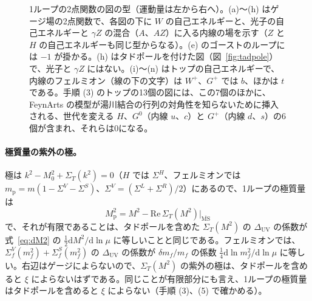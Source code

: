 \documentclass[a4paper,10pt]{ltjsarticle}
\newcommand{\dd}{\mathrm{d}}
\newcommand{\MSbar}{\overline{\mathrm{MS}}}
\newcommand{\DUV}{\Delta_{\mathrm{UV}}}
\newcommand{\re}{\mathrm{Re}\,}
\begin{document}
\begin{figure}[tbp]
\caption{1ループの2点関数の図の型（運動量は左から右へ）。(a)〜(h) はゲージ場の2点関数で、各図の下に $W$ の自己エネルギーと、光子の自己エネルギーと $\gamma Z$ の混合（$A$、$AZ$）に入る内線の場を示す（$Z$ と $H$ の自己エネルギーも同じ型からなる）。(e) のゴーストのループには $-1$ が掛かる。(h) はタドポールを付けた図（図~\ref{fig:tadpole}）で、光子と $\gamma Z$ にはない。(i)〜(n) はトップの自己エネルギーで、内線のフェルミオン（線の下の文字）は $W^+$、$G^+$ では $b$、ほかは $t$ である。手順 (3) のトップの13個の図には、この7個のほかに、FeynArts の模型が湯川結合の行列の対角性を知らないために挿入される、世代を変える $H$、$G^0$（内線 $u$、$c$）と $G^+$（内線 $d$、$s$）の6個が含まれ、それらは0になる。}
\label{fig:se}
\end{figure}

\paragraph{極質量の紫外の極。}極は $k^2-M_0^2+\Sigma_T(k^2)=0$（$H$ では $\Sigma^H$、フェルミオンでは $m_{\mathrm p}=m(1-\Sigma^V-\Sigma^S)$、$\Sigma^V=(\Sigma^L+\Sigma^R)/2$）にあるので、1ループの極質量は
\begin{equation}
M_{\mathrm p}^2=M^2-\re\Sigma_T(M^2)\big|_{\MSbar}
\label{eq:pole}
\end{equation}
で、それが有限であることは、タドポールを含めた $\Sigma_T(M^2)$ の $\DUV$ の係数が式~\eqref{eq:dM2} の $\frac12\dd M^2/\dd\ln\mu$ に等しいことと同じである。フェルミオンでは、$\Sigma^V_f(m_f^2)+\Sigma^S_f(m_f^2)$ の $\DUV$ の係数が $\delta m_f/m_f$ の係数 $\frac14\dd\ln m_f^2/\dd\ln\mu$ に等しい。右辺はゲージによらないので、$\Sigma_T(M^2)$ の紫外の極は、タドポールを含めると $\xi$ によらないはずである。同じことが有限部分にも言え、1ループの極質量はタドポールを含めると $\xi$ によらない（手順 (3)、(5) で確かめる）。
\end{document}
